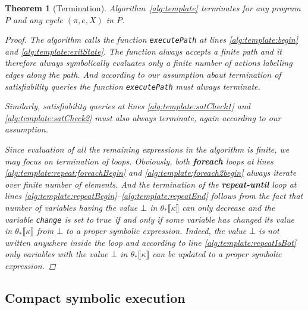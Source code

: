 \documentclass{sig-alternate}%
\newtheorem{thm}{Theorem}%
\newcommand{\true}{\ensuremath{\mathit{true}}}
\newcommand{\prm}[1]{\ensuremath{\llbracket #1 \rrbracket}}
\begin{document}
\begin{thm}[Termination]
Algorithm~\ref{alg:template} terminates for any program $P$ and any
cycle $(\pi,e,X)$ in $P$.
\begin{proof}
The algorithm calls the function \texttt{executePath} at lines
\ref{alg:template:begin} and \ref{alg:template:exitState}. The
function always accepts a finite path and it therefore always
symbolically evaluates only a finite number of actions labelling edges
along the path. And according to our assumption about termination of
satisfiability queries the function \texttt{executePath} must always
terminate.

Similarly, satisfiability queries at lines
\ref{alg:template:satCheck1} and \ref{alg:template:satCheck2} must
also always terminate, again according to our assumption.

Since evaluation of all the remaining expressions in the algorithm is
finite, we may focus on termination of loops. Obviously, both
\textbf{foreach} loops at lines \ref{alg:template:repeat:foreachBegin}
and \ref{alg:template:foreach2begin} always iterate over finite number
of elements. And the termination of the \textbf{repeat-until} loop at lines
\ref{alg:template:repeatBegin}--\ref{alg:template:repeatEnd} follows
from the fact that number of variables having the value $\bot$ in
$\theta_*\prm{\kappa}$ can only decrease and the variable
\texttt{change} is set to $\true$ if and only if some variable has
changed its value in $\theta_*\prm{\kappa}$ from $\bot$ to a proper
symbolic expression. Indeed, the value $\bot$ is not written anywhere inside the loop and according to line \ref{alg:template:repeatIsBot} only variables with the value $\bot$ in $\theta_*\prm{\kappa}$ can be updated to a proper
symbolic expression.
\end{proof}
\end{thm}


\subsection{Compact symbolic execution}
\end{document}
